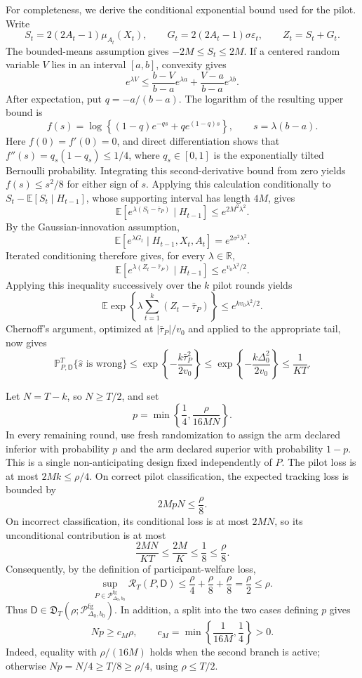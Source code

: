 For completeness, we derive the conditional exponential bound used for the
pilot.  Write
\[
 S_t=2(2A_t-1)\mu_{A_t}(X_t),\qquad
 G_t=2(2A_t-1)\sigma\varepsilon_t,\qquad Z_t=S_t+G_t.
\]
The bounded-means assumption gives \(-2M\leq S_t\leq2M\).  If a centered
random variable \(V\) lies in an interval \([a,b]\), convexity gives
\[
 e^{\lambda V}
 \leq\frac{b-V}{b-a}e^{\lambda a}
     +\frac{V-a}{b-a}e^{\lambda b}.
\]
After expectation, put \(q=-a/(b-a)\).  The logarithm of the resulting upper
bound is
\[
 f(s)=\log\left\{(1-q)e^{-qs}+q e^{(1-q)s}\right\},
 \qquad s=\lambda(b-a).
\]
Here \(f(0)=f'(0)=0\), and direct differentiation shows that
\(f''(s)=q_s(1-q_s)\leq1/4\), where \(q_s\in[0,1]\) is the exponentially
tilted Bernoulli probability.  Integrating this second-derivative bound from
zero yields \(f(s)\leq s^2/8\) for either sign of \(s\).  Applying this
calculation conditionally to
\(S_t-\mathbb E[S_t\mid H_{t-1}]\), whose supporting interval has length
\(4M\), gives
\[
 \mathbb E\left[
 e^{\lambda(S_t-\bar\tau_P)}\mid H_{t-1}
 \right]\leq e^{2M^2\lambda^2}.
\]
By the Gaussian-innovation assumption,
\[
 \mathbb E[e^{\lambda G_t}\mid H_{t-1},X_t,A_t]
 =e^{2\sigma^2\lambda^2}.
\]
Iterated conditioning therefore gives, for every \(\lambda\in\mathbb R\),
\[
 \mathbb E\left[
 e^{\lambda(Z_t-\bar\tau_P)}\mid H_{t-1}
 \right]
 \leq e^{v_0\lambda^2/2}.
\]
Applying this inequality successively over the \(k\) pilot rounds yields
\[
 \mathbb E\exp\left\{
 \lambda\sum_{t=1}^k(Z_t-\bar\tau_P)
 \right\}
 \leq e^{kv_0\lambda^2/2}.
\]
Chernoff's argument, optimized at
\(|\bar\tau_P|/v_0\) and applied to the appropriate tail, now gives
\[
 \mathbb P_{P,\mathsf D}^{T}\{\widehat s\text{ is wrong}\}
 \leq
 \exp\left\{-\frac{k\bar\tau_P^2}{2v_0}\right\}
 \leq
 \exp\left\{-\frac{k\Delta_0^2}{2v_0}\right\}
 \leq\frac{1}{KT}.
\]

Let \(N=T-k\), so \(N\geq T/2\), and set
\[
 p=\min\left\{\frac14,\frac{\rho}{16MN}\right\}.
\]
In every remaining round, use fresh randomization to assign the arm declared
inferior with probability \(p\) and the arm declared superior with probability
\(1-p\).  This is a single non-anticipating design fixed independently of
\(P\).  The pilot loss is at most \(2Mk\leq\rho/4\).  On correct pilot
classification, the expected tracking loss is bounded by
\[
 2MpN\leq\frac\rho8.
\]
On incorrect classification, its conditional loss is at most \(2MN\), so its
unconditional contribution is at most
\[
 \frac{2MN}{KT}\leq\frac{2M}{K}\leq\frac18\leq\frac\rho8.
\]
Consequently, by the definition of participant-welfare loss,
\[
 \sup_{P\in\mathcal P_{\Delta_0,b_0}^{\mathrm{fg}}}
 \mathcal R_T(P,\mathsf D)
 \leq\frac\rho4+\frac\rho8+\frac\rho8
 =\frac\rho2\leq\rho.
\]
Thus \(\mathsf D\in\mathfrak D_T(\rho;
\mathcal P_{\Delta_0,b_0}^{\mathrm{fg}})\).  In addition, a split into the
two cases defining \(p\) gives
\[
 Np\geq c_M\rho,
 \qquad
 c_M=\min\left\{\frac{1}{16M},\frac14\right\}>0.
\]
Indeed, equality with \(\rho/(16M)\) holds when the second branch is active;
otherwise \(Np=N/4\geq T/8\geq\rho/4\), using
\(\rho\leq T/2\).


